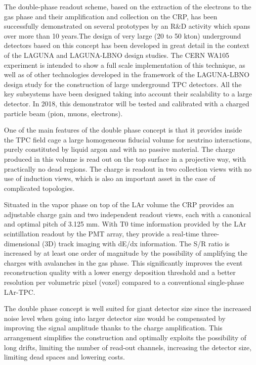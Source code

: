 The double-phase readout scheme, based on the extraction of the electrons to the gas phase and their amplification and collection on the CRP, has been successfully demonstrated on several prototypes  by an R\&D activity which spans over more than 10 years.The design of very large (20 to 50 kton) underground detectors based on this concept has been developed in great detail in the context of the LAGUNA and LAGUNA-LBNO design studies.  The CERN WA105 experiment is intended to show a full scale implementation of this technique, as well as of other technologies developed in the framework of the LAGUNA-LBNO design study for the construction of large underground TPC detectors.  All the key subsystems have been designed taking into account their scalability to a large detector.  In 2018, this demonstrator will be tested and calibrated with a charged particle beam (pion, muons, electrons).

One of the main features of the double phase concept is that it provides inside the TPC field cage a large homogeneous fiducial volume for neutrino interactions, purely constituted by liquid argon and with no passive material. The charge produced in this volume is read out on the top surface in a projective way, with practically no dead regions. The charge is readout in two collection views with no use of induction views, which is also an important asset in the case of complicated topologies. 

Situated in the vapor phase on top of the LAr volume the CRP  provides an adjustable charge gain and two independent readout views, each with a canonical and optimal pitch of 3.125 mm.  With T0 time information provided by the LAr scintillation readout by the PMT array, they provide a real-time three-dimensional (3D) track imaging with dE/dx information. The S/R ratio is increased by at least one order of magnitude by the possibility of amplifying the charges with avalanches in the gas phase.  This significantly improves the event reconstruction quality with a lower energy deposition threshold and a better resolution per volumetric pixel (voxel) compared to a conventional single-phase LAr-TPC. 

The double phase concept is well suited for giant detector size since the increased noise level when going into larger detector size would be compensated by improving the signal amplitude thanks to the charge amplification.  This arrangement simplifies the construction and optimally exploits the possibility of long drifts, limiting the number of read-out channels, increasing the detector size, limiting dead spaces and lowering costs.

